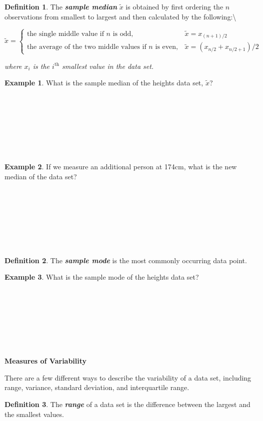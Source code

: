 \documentclass[
  11pt,
  oneside]{book}
\theoremstyle{definition}
\newtheorem{definition}{Definition}[chapter]
\theoremstyle{definition}
\newtheorem{example}{Example}[chapter]
\theoremstyle{definition}
\theoremstyle{definition}
\theoremstyle{remark}
\begin{document}
\begin{definition}
The \textbf{\emph{sample median}} \(\tilde{x}\) is obtained by first ordering the \(n\) observations from smallest to largest and then calculated by the following:\textbackslash{}

\[
\tilde{x} =
\begin{cases}
\mbox{the single middle value if $n$ is odd}, & \tilde{x} = x_{(n+1)/2} \\
\mbox{the average of the two middle values if $n$ is even}, & \tilde{x} = ( x_{n/2} + x_{n/2 + 1 })/2
\end{cases}
\]

\textit{where $x_i$ is the $i^\text{th}$ smallest value in the data set.}
\end{definition}

\newpage

\begin{example}
What is the sample median of the heights data set, \(\tilde{x}\)?
\end{example}

\(~\)

\(~\)

\(~\)

\(~\)

\begin{example}
If we measure an additional person at 174cm, what is the new median of the data set?
\end{example}

\(~\)

\(~\)

\(~\)

\(~\)

\begin{definition}
The \textbf{\emph{sample mode}} is the most commonly occurring data point.
\end{definition}

\begin{example}
What is the sample mode of the heights data set?
\end{example}

\(~\)

\(~\)

\(~\)

\(~\)

\textbf{Measures of Variability}

There are a few different ways to describe the variability of a data set, including range, variance, standard deviation, and interquartile range.

\begin{definition}
The \textbf{\emph{range}} of a data set is the difference between the largest and the smallest values.
\end{definition}
\end{document}
